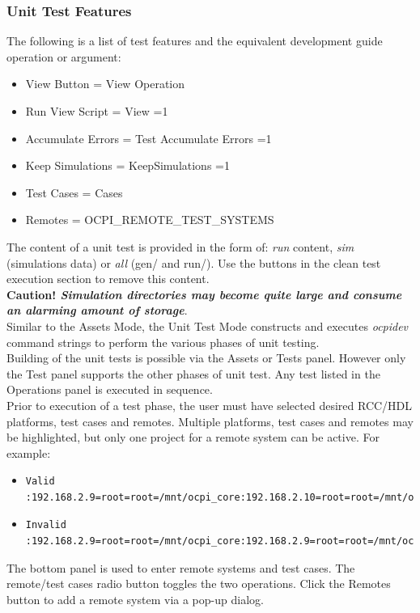 \documentclass[10pt, a4paper, oneside]{article}
\begin{document}
\subsubsection{Unit Test Features}
The following is a list of test features and the equivalent development guide operation or argument:
\begin{itemize}
\item	View Button = View Operation
\item	Run View Script = View =1
\item	Accumulate Errors = Test Accumulate Errors =1
\item	Keep Simulations = KeepSimulations =1
\item	Test Cases = Cases
\item	Remotes = OCPI\_REMOTE\_TEST\_SYSTEMS
\end{itemize}

The content of a unit test is provided in the form of: \emph{run} content, \emph{sim} (simulations data) or \emph{all} (gen/ and run/). Use the buttons in the clean test execution section to remove this content. \\

\textbf{Caution! \emph{Simulation directories may become quite large and consume an alarming amount of storage}}.\\

Similar to the Assets Mode, the Unit Test Mode constructs and executes \emph{ocpidev} command strings to perform the various phases of unit testing.\\

Building of the unit tests is possible via the Assets or Tests panel. However only the Test panel supports the other phases of unit test. Any test listed in the Operations panel is executed in sequence. \\

Prior to execution of a test phase, the user must have selected desired RCC/HDL platforms, test cases and remotes. Multiple platforms, test cases and remotes may be highlighted, but only one project for a remote system can be active.
For example:
\begin{itemize}
\item\begin{verbatim}Valid :192.168.2.9=root=root=/mnt/ocpi_core:192.168.2.10=root=root=/mnt/ocpi_assets\end{verbatim}
\item	\begin{verbatim}Invalid :192.168.2.9=root=root=/mnt/ocpi_core:192.168.2.9=root=root=/mnt/ocpi_assets\end{verbatim}
\end{itemize}
The bottom panel is used to enter remote systems and test cases. The remote/test cases radio button toggles the two operations. Click the Remotes button to add a remote system via a pop-up dialog. \\
\end{document}
